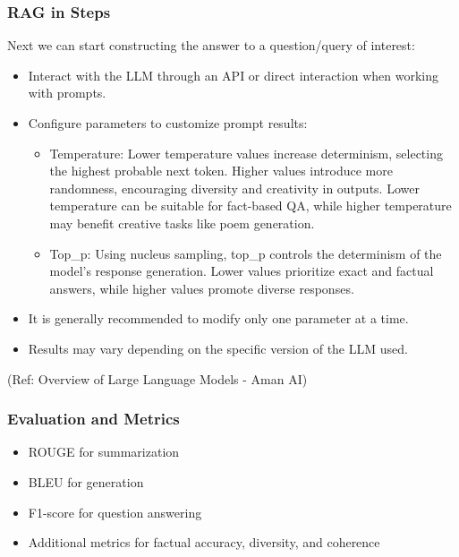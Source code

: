 \begin{frame}[fragile]\frametitle{RAG in Steps}

Next we can start constructing the answer to a question/query of interest:

\begin{itemize}
\item Interact with the LLM through an API or direct interaction when working with prompts.
\item Configure parameters to customize prompt results:

\begin{itemize}
\item Temperature: Lower temperature values increase determinism, selecting the highest probable next token. Higher values introduce more randomness, encouraging diversity and creativity in outputs. Lower temperature can be suitable for fact-based QA, while higher temperature may benefit creative tasks like poem generation.
\item Top\_p: Using nucleus sampling, top\_p controls the determinism of the model's response generation. Lower values prioritize exact and factual answers, while higher values promote diverse responses.
\end{itemize}

\item It is generally recommended to modify only one parameter at a time.
\item Results may vary depending on the specific version of the LLM used.
\end{itemize}

{\tiny (Ref: Overview of Large Language Models - Aman AI)}

\end{frame}

\begin{frame}[fragile]\frametitle{Evaluation and Metrics}

\begin{itemize}
\item ROUGE for summarization
\item BLEU for generation
\item F1-score for question answering
\item Additional metrics for factual accuracy, diversity, and coherence
\end{itemize}	

\end{frame}

